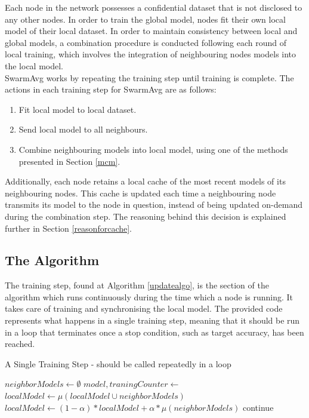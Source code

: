 \documentclass[letterpaper, 10 pt, conference]{ieeeconf}  %
\begin{document}
Each node in the network possesses a confidential dataset that is not disclosed to any other nodes. In order to train the global model, nodes fit their own local model of their local dataset. In order to maintain consistency between local and global models, a combination procedure is conducted following each round of local training, which involves the integration of neighbouring nodes models into the local model. \\

SwarmAvg works by repeating the training step until training is complete. The actions in each training step for SwarmAvg are as follows:
\begin{enumerate}
	\item Fit local model to local dataset.
	\item Send local model to all neighbours.
	\item Combine neighbouring models into local model, using one of the methods presented in Section \ref{mcm}.
\end{enumerate}

Additionally, each node retains a local cache of the most recent models of its neighbouring nodes. This cache is updated each time a neighbouring node transmits its model to the node in question, instead of being updated on-demand during the combination step. The reasoning behind this decision is explained further in Section \ref{reasonforcache}.

\subsection{The Algorithm}
The training step, found at Algorithm \ref{updatealgo}, is the section of the algorithm which runs continuously during the time which a node is running. It takes care of training and synchronising the local model. The provided code represents what happens in a single training step, meaning that it should be run in a loop that terminates once a stop condition, such as target accuracy, has been reached.

\begin{algorithm}[H]
	\caption{A Single Training Step - should be called repeatedly in a loop} \label{updatealgo}
	\begin{algorithmic}[1]
		\State {}
		\State {}
		\EndFor
		
		\State $neighborModels \gets \emptyset$
		\State $model, traningCounter \gets$ 
		\State {}
		\EndIf
		\EndFor
		\State $localModel \gets \mu(localModel \cup neighborModels)$
		\State $localModel \gets (1 - \alpha) * localModel + \alpha * \mu(neighborModels)$
		\EndIf
		\Else
		\State continue
		\EndIf
		\State {}
		\EndFor
	\end{algorithmic}
\end{algorithm}
\end{document}
